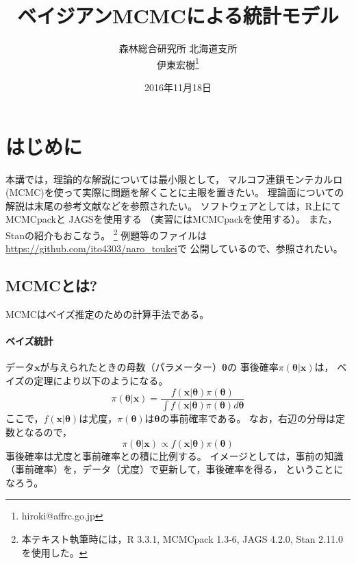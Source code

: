 \documentclass[11pt,uplatex]{jsarticle}
\begin{document}
\title{ベイジアンMCMCによる統計モデル}
\author{森林総合研究所 北海道支所\\伊東宏樹\footnote{hiroki@affrc.go.jp}}
\date{2016年11月18日}
\maketitle


\section{はじめに}

本講では，理論的な解説については最小限として，
マルコフ連鎖モンテカルロ(MCMC)を使って実際に問題を解くことに主眼を置きたい。
理論面についての解説は末尾の参考文献などを参照されたい。
ソフトウェアとしては，\textsf{R}\cite{R}上にて
\textsf{MCMCpack}\cite{MCMCpack}と
\textsf{JAGS}\cite{JAGS}を使用する
（実習には\textsf{MCMCpack}を使用する）。
また，\textsf{Stan}\cite{Stan}の紹介もおこなう。
\footnote{本テキスト執筆時には，R 3.3.1, MCMCpack 1.3-6, JAGS 4.2.0, Stan 2.11.0を使用した。}
例題等のファイルは\url{https://github.com/ito4303/naro_toukei}で
公開しているので、参照されたい。

\subsection{MCMCとは?}

MCMCはベイズ推定のための計算手法である。

\paragraph{ベイズ統計}

データ$\bm{x}$が与えられたときの母数（パラメーター）$\bm{\theta}$の
事後確率$\pi(\bm{\theta}|\bm{x})$は，
ベイズの定理により以下のようになる。
\begin{equation}
\pi(\bm{\theta}|\bm{x}) = \frac{f(\bm{x}|\bm{\theta})\pi(\bm{\theta})}
{\int{f(\bm{x}|\bm{\theta})\pi(\bm{\theta})d\bm{\theta}}}\label{bayes1}
\end{equation}
ここで，$f(\bm{x}|\bm{\theta})$は尤度，$\pi(\bm{\theta})$は$\bm{\theta}$の事前確率である。
なお，右辺の分母は定数となるので，
\begin{equation}
\pi(\bm{\theta}|\bm{x}) \propto f(\bm{x}|\bm{\theta})\pi(\bm{\theta})\label{bayes2}
\end{equation}
事後確率は尤度と事前確率との積に比例する。
イメージとしては，事前の知識（事前確率）を，データ（尤度）で更新して，事後確率を得る，
ということになろう。
\end{document}
